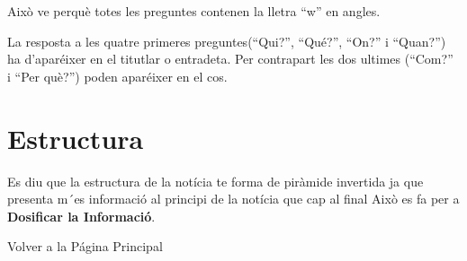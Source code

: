 \documentclass[
]{article}
\begin{document}
Això ve perquè totes les preguntes contenen la lletra ``w'' en angles.

La resposta a les quatre primeres preguntes(``Qui?'', ``Qué?'', ``On?''
i ``Quan?'') ha d'aparéixer en el titutlar o entradeta. Per contrapart
les dos ultimes (``Com?'' i ``Per què?'') poden aparéixer en el cos.

\hypertarget{estructura}{%
\section{Estructura}\label{estructura}}

Es diu que la estructura de la notícia te forma de piràmide invertida ja
que presenta m´es informació al principi de la notícia que cap al final
Això es fa per a \textbf{Dosificar la Informació}.

Volver a la Página Principal
\end{document}
